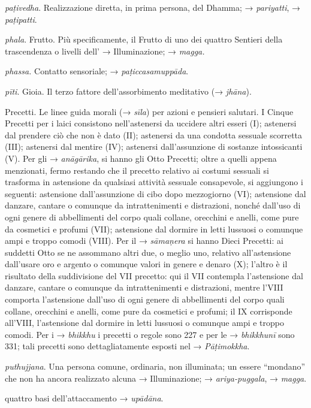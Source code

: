 \emph{paṭivedha}. Realizzazione diretta, in prima persona, del Dhamma; →
\emph{pariyatti}, → \emph{paṭipatti}.

\emph{phala}. Frutto. Più specificamente, il Frutto di uno dei quattro
Sentieri della trascendenza o livelli dell' → Illuminazione; →
\emph{magga.}

\emph{phassa.} Contatto sensoriale; → \emph{paṭiccasamuppāda}.

\emph{pīti}. Gioia. Il terzo fattore dell'assorbimento meditativo (→
\emph{jhāna}).

Precetti. Le linee guida morali (→ \emph{sīla}) per azioni e pensieri
salutari. I Cinque Precetti per i laici consistono nell'astenersi da
uccidere altri esseri (I); astenersi dal prendere ciò che non è dato
(II); astenersi da una condotta sessuale scorretta (III); astenersi dal
mentire (IV); astenersi dall'assunzione di sostanze intossicanti (V).
Per gli → \emph{anāgārika}, si hanno gli Otto Precetti; oltre a quelli
appena menzionati, fermo restando che il precetto relativo ai costumi
sessuali si trasforma in astensione da qualsiasi attività sessuale
consapevole, si aggiungono i seguenti: astensione dall'assunzione di
cibo dopo mezzogiorno (VI); astensione dal danzare, cantare o comunque
da intrattenimenti e distrazioni, nonché dall'uso di ogni genere di
abbellimenti del corpo quali collane, orecchini e anelli, come pure da
cosmetici e profumi (VII); astensione dal dormire in letti lussuosi o
comunque ampi e troppo comodi (VIII). Per il → \emph{sāmaṇera} si hanno
Dieci Precetti: ai suddetti Otto se ne assommano altri due, o meglio
uno, relativo all'astensione dall'usare oro e argento o comunque valori
in genere e denaro (X); l'altro è il risultato della suddivisione del
VII precetto: qui il VII contempla l'astensione dal danzare, cantare o
comunque da intrattenimenti e distrazioni, mentre l'VIII comporta
l'astensione dall'uso di ogni genere di abbellimenti del corpo quali
collane, orecchini e anelli, come pure da cosmetici e profumi; il IX
corrisponde all'VIII, l'astensione dal dormire in letti lussuosi o
comunque ampi e troppo comodi. Per i → \emph{bhikkhu} i precetti o
regole sono 227 e per le → \emph{bhikkhunī} sono 331; tali precetti sono
dettagliatamente esposti nel → \emph{Pāṭimokkha}.

\emph{puthujjana}. Una persona comune, ordinaria, non illuminata; un
essere ``mondano'' che non ha ancora realizzato alcuna → Illuminazione;
→ \emph{ariya-puggala}, → \emph{magga}.

quattro basi dell'attaccamento → \emph{upādāna}.

